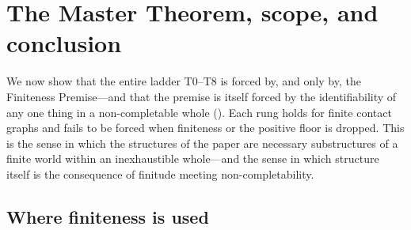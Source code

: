 \documentclass[11pt,a4paper]{article}
\theoremstyle{thmstyle}
\theoremstyle{definition}
\theoremstyle{remark}
\begin{document}
\section{The Master Theorem, scope, and conclusion}
\label{sec:master}

We now show that the entire ladder T0--T8 is forced by, and only by, the
Finiteness Premise---and that the premise is itself forced by the identifiability
of any one thing in a non-completable whole (). Each rung holds
for finite contact graphs and fails to be forced when finiteness or the positive
floor is dropped. This is the sense in which the structures of the paper are
necessary substructures of a finite world within an inexhaustible whole---and the
sense in which structure itself is the consequence of finitude meeting
non-completability.

\subsection{Where finiteness is used}
\end{document}
